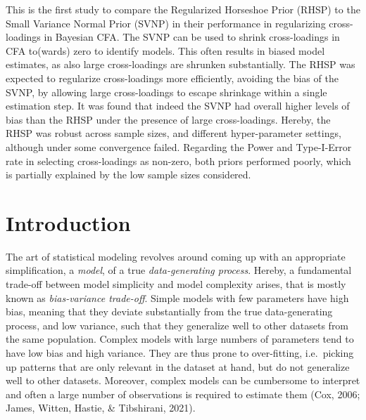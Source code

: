 \documentclass[
  english,
  man, donotrepeattitle,floatsintext]{apa6}
\begin{document}
This is the first study to compare the Regularized Horseshoe Prior (RHSP) to the Small Variance Normal Prior (SVNP) in their performance in regularizing cross-loadings in Bayesian CFA. The SVNP can be used to shrink cross-loadings in CFA to(wards) zero to identify models. This often results in biased model estimates, as also large cross-loadings are shrunken substantially. The RHSP was expected to regularize cross-loadings more efficiently, avoiding the bias of the SVNP, by allowing large cross-loadings to escape shrinkage within a single estimation step. It was found that indeed the SVNP had overall higher levels of bias than the RHSP under the presence of large cross-loadings. Hereby, the RHSP was robust across sample sizes, and different hyper-parameter settings, although under some convergence failed. Regarding the Power and Type-I-Error rate in selecting cross-loadings as non-zero, both priors performed poorly, which is partially explained by the low sample sizes considered.

\hypertarget{introduction}{%
\section{Introduction}\label{introduction}}

The art of statistical modeling revolves around coming up with an appropriate simplification, a \emph{model}, of a true \emph{data-generating process}. Hereby, a fundamental trade-off between model simplicity and model complexity arises, that is mostly known as \emph{bias-variance trade-off}. Simple models with few parameters have high bias, meaning that they deviate substantially from the true data-generating process, and low variance, such that they generalize well to other datasets from the same population. Complex models with large numbers of parameters tend to have low bias and high variance. They are thus prone to over-fitting, i.e.~picking up patterns that are only relevant in the dataset at hand, but do not generalize well to other datasets. Moreover, complex models can be cumbersome to interpret and often a large number of observations is required to estimate them (Cox, 2006; James, Witten, Hastie, \& Tibshirani, 2021).
\end{document}
